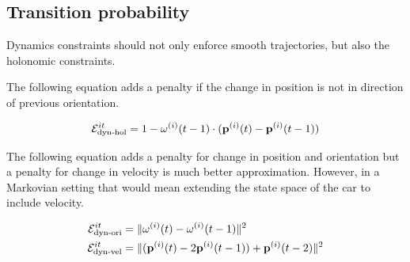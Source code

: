 \documentclass[10pt,twocolumn,letterpaper]{article}
\begin{document}

\subsection{Transition probability}
Dynamics constraints should not only enforce smooth trajectories, but also the
holonomic constraints.

The following equation adds a penalty if the change in
position is not in direction of previous orientation.

\begin{align}
  \label{eq:totalPosTransitionEnergy}
  \mathcal{E}^{it}_{\text{dyn-hol}} = 1 - \mathbf{\omega}^{(i)}(t-1) \cdot (\mathbf{p}^{(i)}(t) - \mathbf{p}^{(i)}(t-1))
\end{align}

The following equation adds a penalty for change in position and orientation
but a penalty for change in velocity is much better approximation. However, in
a Markovian setting that would mean extending the state space of the car to
include velocity.

\begin{align}
  \mathcal{E}^{it}_{\text{dyn-ori}} &= \|\mathbf{\omega}^{(i)}(t) - \mathbf{\omega}^{(i)}(t-1)\|^2\\
  \mathcal{E}^{it}_{\text{dyn-vel}} &= \|(\mathbf{p}^{(i)}(t) - 2\mathbf{p}^{(i)}(t-1)) + \mathbf{p}^{(i)}(t-2)\|^2
\end{align}
\end{document}
